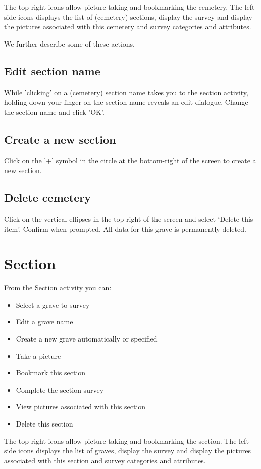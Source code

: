 \documentclass{scrreprt}
\begin{document}
The top-right icons allow picture taking and bookmarking the cemetery. The left-side icons displays the list of (cemetery) sections, display the survey and display the pictures associated with this cemetery and survey categories and attributes.

We further describe some of these actions.

\subsection{Edit section name}
While 'clicking' on a (cemetery) section name takes you to the section activity, holding down  your finger on the section name reveals an edit dialogue. Change the section name and click 'OK'.

\subsection{Create a new section}
Click on the '+' symbol in the circle at the bottom-right of the screen to create a new section.

\subsection{Delete cemetery}
Click on the vertical ellipses in the top-right of the screen and select `Delete this item'. Confirm when prompted. All data for this grave is permanently deleted.

\section{Section}
From the Section activity you can:
\begin{itemize}
\item Select a grave to survey
\item Edit a grave name
\item Create a new grave automatically or specified
\item Take a picture
\item Bookmark this section
\item Complete the section survey
\item View pictures associated with this section
\item Delete this section
\end{itemize}

The top-right icons allow picture taking and bookmarking the section. The left-side icons displays the list of graves, display the survey and display the pictures associated with this section and survey categories and attributes.
\end{document}

